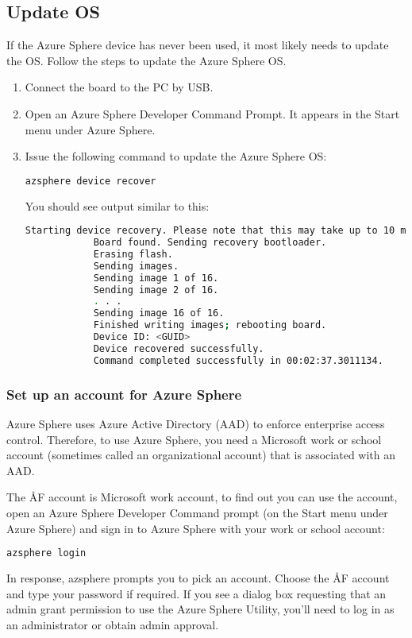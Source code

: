 \subsection{Update OS}
If the Azure Sphere device has never been used, it most likely needs to update the OS. Follow the steps to update the Azure Sphere OS.
\begin{enumerate}
    \item Connect the board to the PC by USB.
    \item Open an Azure Sphere Developer Command Prompt. It appears in the Start menu under Azure Sphere.
    \item Issue the following command to update the Azure Sphere OS:
        \begin{lstlisting}[language=bash]
            azsphere device recover
        \end{lstlisting}
    You should see output similar to this:
        \begin{lstlisting}[language=bash]
            Starting device recovery. Please note that this may take up to 10 minutes.
            Board found. Sending recovery bootloader.
            Erasing flash.
            Sending images.
            Sending image 1 of 16.
            Sending image 2 of 16.
            . . . 
            Sending image 16 of 16.
            Finished writing images; rebooting board.
            Device ID: <GUID>
            Device recovered successfully.
            Command completed successfully in 00:02:37.3011134.
        \end{lstlisting}
\end{enumerate}

\subsubsection{Set up an account for Azure Sphere}
Azure Sphere uses Azure Active Directory (AAD) to enforce enterprise access control. Therefore, to use Azure Sphere, you need a Microsoft work or school account (sometimes called an organizational account) that is associated with an AAD.

The ÅF account is Microsoft work account, to find out you can use the account, open an Azure Sphere Developer Command prompt (on the Start menu under Azure Sphere) and sign in to Azure Sphere with your work or school account:
\begin{lstlisting}[language=bash]
    azsphere login
\end{lstlisting}
In response, azsphere prompts you to pick an account. Choose the ÅF account and type your password if required. If you see a dialog box requesting that an admin grant permission to use the Azure Sphere Utility, you'll need to log in as an administrator or obtain admin approval.

